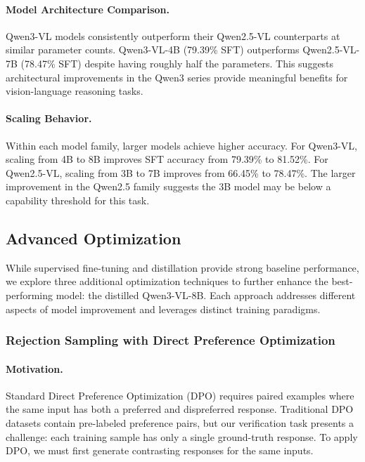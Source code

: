 \documentclass[11pt,a4paper]{article}
\begin{document}
\paragraph{Model Architecture Comparison.} Qwen3-VL models consistently outperform their Qwen2.5-VL counterparts at similar parameter counts. Qwen3-VL-4B (79.39\% SFT) outperforms Qwen2.5-VL-7B (78.47\% SFT) despite having roughly half the parameters. This suggests architectural improvements in the Qwen3 series provide meaningful benefits for vision-language reasoning tasks.

\paragraph{Scaling Behavior.} Within each model family, larger models achieve higher accuracy. For Qwen3-VL, scaling from 4B to 8B improves SFT accuracy from 79.39\% to 81.52\%. For Qwen2.5-VL, scaling from 3B to 7B improves from 66.45\% to 78.47\%. The larger improvement in the Qwen2.5 family suggests the 3B model may be below a capability threshold for this task.


\subsection{Advanced Optimization}

While supervised fine-tuning and distillation provide strong baseline performance, we explore three additional optimization techniques to further enhance the best-performing model: the distilled Qwen3-VL-8B. Each approach addresses different aspects of model improvement and leverages distinct training paradigms.

\subsubsection{Rejection Sampling with Direct Preference Optimization}

\paragraph{Motivation.} Standard Direct Preference Optimization (DPO) requires paired examples where the same input has both a preferred and dispreferred response. Traditional DPO datasets contain pre-labeled preference pairs, but our verification task presents a challenge: each training sample has only a single ground-truth response. To apply DPO, we must first generate contrasting responses for the same inputs.
\end{document}
